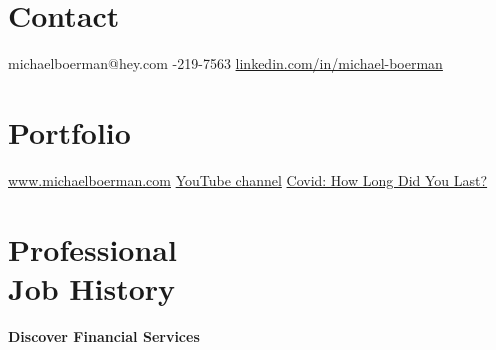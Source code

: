 \documentclass[margin, line]{res}
\begin{document}
\address{Data scientist with M.S. and 3 years experience driving decisions by modeling financial and economic data.}
\begin{resume}

\vspace{-1mm}
\section{\sc Contact}

\faEnvelope  \hspace{0.5mm} {\ttfamily michaelboerman@hey.com} \hspace{3mm}
\faPhone  \hspace{0.5mm} {-219-7563} \hspace{8.5mm}
\faLinkedinIn  \hspace{0.5mm} \href{https://www.linkedin.com/in/michael-boerman}{\ttfamily linkedin.com/in/michael-boerman}\\
\vspace{-5mm}


\section{\sc Portfolio}
\faBriefcase \hspace{0.5mm} \href{https://www.michaelboerman.com/}{\ttfamily www.michaelboerman.com} \hspace{3.5mm}
 \hspace{0.5mm} \href{https://www.youtube.com/watch?v=NswRVSZcy7M}{YouTube channel} \hspace{2mm}
\faChartLine \hspace{0.5mm} \href{https://michaelboerman.shinyapps.io/covid_percentiles/}{ Covid: How Long Did You Last?}\\
\vspace{-.35cm}


\section{\sc Professional \\ Job History }

{\bf Discover Financial Services}\\


\end{resume}
\end{document}
